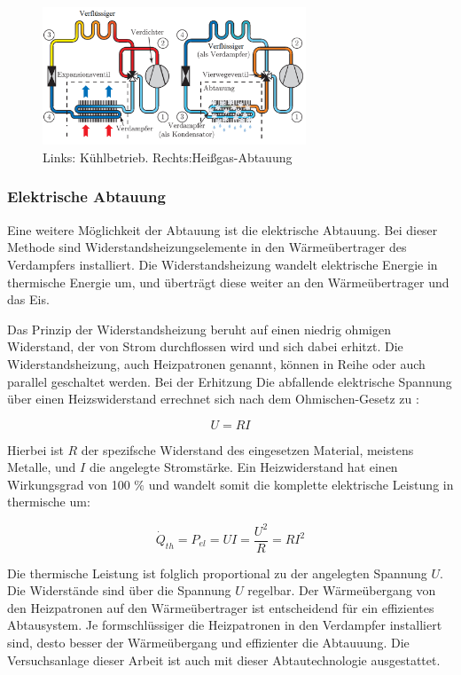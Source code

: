 \begin{figure}[htb]
\centering		\includegraphics[width=0.7\textwidth]{Pictures/Prozessumkehrung_Kosowski.png}
\caption{Links: Kühlbetrieb. Rechts:Heißgas-Abtauung \citep{Kosowski2009}}
\label{fig:Prozessumkehrung}
\end{figure}

\subsubsection*{Elektrische Abtauung}

Eine weitere Möglichkeit der Abtauung ist die elektrische Abtauung. Bei dieser Methode sind Widerstandsheizungselemente in den Wärmeübertrager des Verdampfers installiert. Die Widerstandsheizung wandelt elektrische Energie in thermische Energie um, und überträgt diese weiter an den Wärmeübertrager und das Eis. 

Das Prinzip der Widerstandsheizung beruht auf einen niedrig ohmigen Widerstand, der von Strom durchflossen wird und sich dabei erhitzt. Die Widerstandsheizung, auch Heizpatronen genannt, können in Reihe oder auch parallel geschaltet werden. Bei der Erhitzung  Die abfallende elektrische Spannung über einen Heizswiderstand errechnet sich nach dem Ohmischen-Gesetz zu :

\begin{equation}
U = R I
\label{eq: Ohmisches Gesetz}
\end{equation}

Hierbei ist $R$ der spezifsche Widerstand des eingesetzen Material, meistens Metalle,  und $I$ die angelegte Stromstärke. Ein Heizwiderstand hat einen Wirkungsgrad von 100 $\%$ und wandelt somit die komplette elektrische Leistung in thermische um:

\begin{equation}
\dot{Q}_{th}= P_{el }= U I = \frac{U^2}{R} =  R I^2 
\label{eq:Leistung Heizwiderstand}
\end{equation}

Die thermische Leistung ist folglich proportional zu der angelegten Spannung $U$. Die Widerstände sind über die Spannung $U$ regelbar. Der Wärmeübergang von den Heizpatronen auf den Wärmeübertrager ist entscheidend für ein effizientes Abtausystem. Je formschlüssiger die Heizpatronen in den Verdampfer installiert sind, desto besser der Wärmeübergang und effizienter die Abtauuung.  
Die Versuchsanlage dieser Arbeit ist auch mit dieser Abtautechnologie ausgestattet. 

